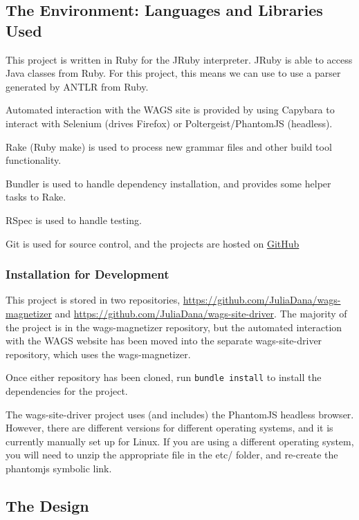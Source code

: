 \documentclass[letter,10pt,final]{article}
\begin{document}
\subsection{The Environment: Languages and Libraries Used}
This project is written in Ruby for the JRuby interpreter. JRuby is able
to access Java classes from Ruby. For this project, this means we can 
use to use a parser generated by ANTLR from Ruby.

Automated interaction with the WAGS site is provided by using Capybara 
to interact with Selenium (drives Firefox) or Poltergeist/PhantomJS 
(headless).

Rake (Ruby make) is used to process new grammar files and other build 
tool functionality.

Bundler is used to handle dependency installation, and provides some 
helper tasks to Rake.

RSpec is used to handle testing.

Git is used for source control, and the projects are hosted on 
\href{http://github.com}{GitHub}

\subsubsection{Installation for Development}
This project is stored in two repositories, 
\url{https://github.com/JuliaDana/wags-magnetizer} and 
\url{https://github.com/JuliaDana/wags-site-driver}. The majority of 
the project is in the wags-magnetizer repository, but the automated 
interaction with the WAGS website has been moved into the separate 
wags-site-driver repository, which uses the wags-magnetizer.

Once either repository has been cloned, run \verb~bundle install~ to 
install the dependencies for the project.

The wags-site-driver project uses (and includes) the PhantomJS headless 
browser. However, there are different versions for different operating 
systems, and it is currently manually set up for Linux. If you are 
using a different operating system, you will need to unzip the 
appropriate file in the etc/ folder, and re-create the phantomjs 
symbolic link.

\subsection{The Design}
\end{document}
